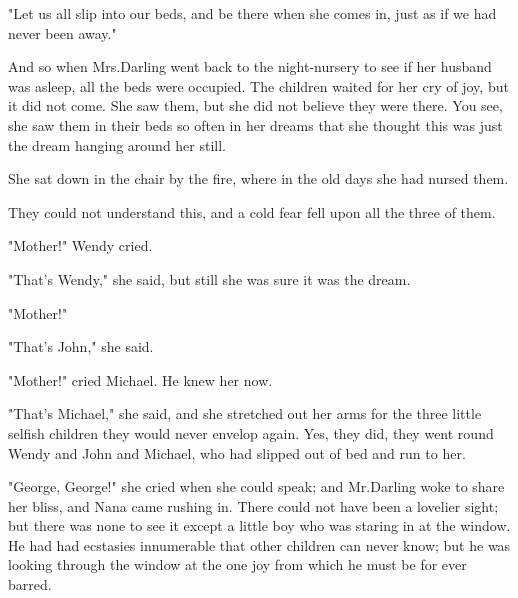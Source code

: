 "Let us all slip into our beds, and be there when she comes in,
just as if we had never been away."

And so when Mrs.\@ Darling went back to the night-nursery to see if her husband was asleep,
all the beds were occupied.
The children waited for her cry of joy, but it did not come.
She saw them, but she did not believe they were there.
You see, she saw them in their beds so often in her dreams
that she thought this was just the dream hanging around her still.

She sat down in the chair by the fire, where in the old days she had nursed them.

They could not understand this, and a cold fear fell upon all the three of them.

"Mother!\@" Wendy cried.

"That's Wendy," she said, but still she was sure it was the dream.

"Mother!"

"That's John," she said.

"Mother!\@" cried Michael.
He knew her now.

"That's Michael," she said,
and she stretched out her arms for the three little selfish children they would never envelop again.
Yes, they did, they went round Wendy and John and Michael, who had slipped out of bed and run to her.

"George, George!\@" she cried when she could speak;
and Mr.\@ Darling woke to share her bliss, and Nana came rushing in.
There could not have been a lovelier sight;
but there was none to see it except a little boy who was staring in at the window.
He had had ecstasies innumerable that other children can never know;
but he was looking through the window at the one joy from which he must be for ever barred.

\endinput
